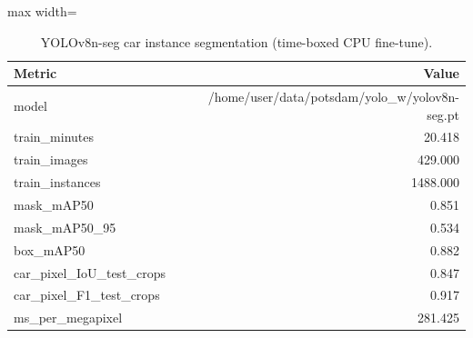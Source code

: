 \begin{table}[H]\centering\small
\caption{YOLOv8n-seg car instance segmentation (time-boxed CPU fine-tune).}\label{tab:yolo}
\begin{adjustbox}{max width=\linewidth}\begin{tabular}{lr}\toprule
\textbf{Metric} & \textbf{Value} \\\midrule
model & /home/user/data/potsdam/yolo\_w/yolov8n-seg.pt \\
train\_minutes & 20.418 \\
train\_images & 429.000 \\
train\_instances & 1488.000 \\
mask\_mAP50 & 0.851 \\
mask\_mAP50\_95 & 0.534 \\
box\_mAP50 & 0.882 \\
car\_pixel\_IoU\_test\_crops & 0.847 \\
car\_pixel\_F1\_test\_crops & 0.917 \\
ms\_per\_megapixel & 281.425 \\
\bottomrule\end{tabular}\end{adjustbox}\end{table}